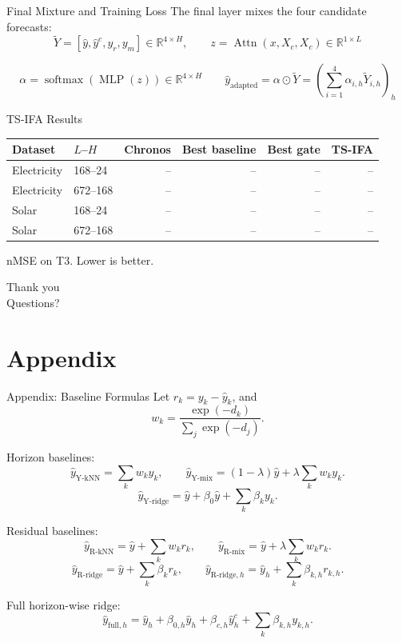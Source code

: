 \begin{frame}{Final Mixture and Training Loss}
  \small
  The final layer mixes the four candidate forecasts:
  \[
    \tilde{Y}=[\hat y,\hat y^c,y_r,y_m] \in \mathbb{R}^{4\times H},
    \qquad z=\operatorname{Attn}(x,X_c,X_c) \in \mathbb{R}^{1\times L}
  \]

  \[ \alpha = \operatorname{softmax}(\operatorname{MLP}(z)) \in \mathbb{R}^{4 \times H} \qquad 
    \hat y_{\mathrm{adapted}}
    = \alpha \odot \tilde{Y}=(\sum_{i=1}^4 \alpha_{i,h} \tilde{Y}_{i,h})_h
  \]

  
\end{frame}

\begin{frame}{TS-IFA Results}
  \scriptsize
  \centering
  \begin{tabular}{llrrrr}
    \toprule
    \textbf{Dataset} & \textbf{$L$--$H$} &
    \textbf{Chronos} & \textbf{Best baseline} &
    \textbf{Best gate} & \textbf{TS-IFA} \\
    \midrule
    Electricity & 168--24 & -- & -- & -- & -- \\
    Electricity & 672--168 & -- & -- & -- & -- \\
    Solar & 168--24 & -- & -- & -- & -- \\
    Solar & 672--168 & -- & -- & -- & -- \\
    \bottomrule
  \end{tabular}

  \vspace{0.25cm}
  \scriptsize nMSE on T3. Lower is better.
\end{frame}

\begin{frame}[standout]
  Thank you\\
  Questions?
\end{frame}

\appendix
\section{Appendix}

\begin{frame}{Appendix: Baseline Formulas}
  \scriptsize
  Let $r_k=y_k-\hat y_k$, and
  \[
    w_k=\frac{\exp(-d_k)}{\sum_j \exp(-d_j)}.
  \]

  Horizon baselines:
  \[
    \hat y_{\mathrm{Y\mbox{-}kNN}}=\sum_k w_k y_k,
    \qquad
    \hat y_{\mathrm{Y\mbox{-}mix}}=(1-\lambda)\hat y+\lambda\sum_k w_k y_k.
  \]
  \[
    \hat y_{\mathrm{Y\mbox{-}ridge}}=\hat y+
    \beta_0\hat y+\sum_k\beta_k y_k.
  \]

  Residual baselines:
  \[
    \hat y_{\mathrm{R\mbox{-}kNN}}=\hat y+\sum_k w_k r_k,
    \qquad
    \hat y_{\mathrm{R\mbox{-}mix}}=\hat y+\lambda\sum_k w_k r_k.
  \]
  \[
    \hat y_{\mathrm{R\mbox{-}ridge}}=\hat y+\sum_k\beta_k r_k,
    \qquad
    \hat y_{\mathrm{R\mbox{-}ridge},h}=\hat y_h+\sum_k \beta_{k,h} r_{k,h}.
  \]

  Full horizon-wise ridge:
  \[
    \hat y_{\mathrm{full},h}
    =\hat y_h+\beta_{0,h}\hat y_h+\beta_{c,h}\hat y^c_h
     +\sum_k\beta_{k,h}y_{k,h}.
  \]
\end{frame}

